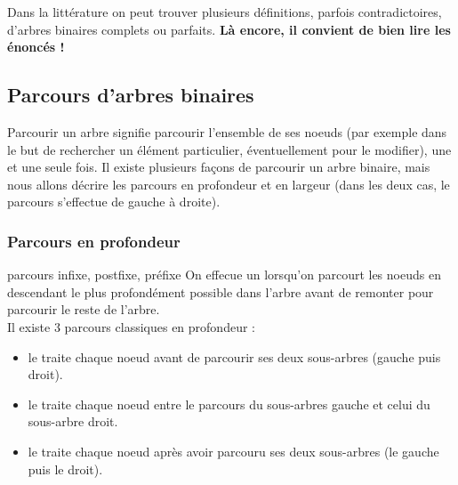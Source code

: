  \begin{remarque}{7.14}{}
    Dans la littérature on peut trouver plusieurs définitions, parfois contradictoires, d'arbres binaires complets ou parfaits. \textbf{Là encore, il convient de bien lire les énoncés !}
 \end{remarque}

 \subsection{Parcours d'arbres binaires}
 Parcourir un arbre signifie parcourir l'ensemble de ses noeuds (par exemple dans le but de rechercher un élément particulier, éventuellement pour le modifier), une et une seule fois. Il existe plusieurs façons de parcourir un arbre binaire, mais nous allons décrire les parcours en profondeur et en largeur (dans les deux cas, le parcours s'effectue de gauche à droite).

 \subsubsection{Parcours en profondeur}
 \begin{definition}{7.15}{parcours infixe, postfixe, préfixe}
    On effecue un  lorsqu'on parcourt les noeuds en descendant le plus profondément possible dans l'arbre avant de remonter pour parcourir le reste de l'arbre. \\Il existe 3 parcours classiques en profondeur : \begin{itemize}
        \item le  traite chaque noeud avant de parcourir ses deux sous-arbres (gauche puis droit).
        \item le  traite chaque noeud entre le parcours du sous-arbres gauche et celui du sous-arbre droit.
        \item le  traite chaque noeud après avoir parcouru ses deux sous-arbres (le gauche puis le droit).
    \end{itemize}
 \end{definition}


